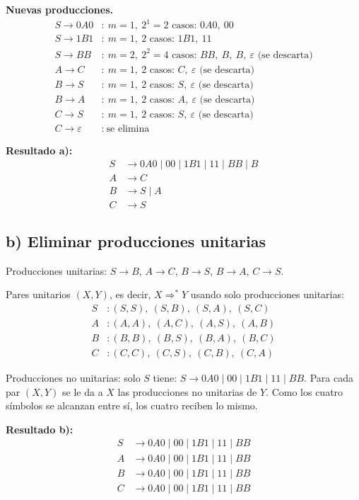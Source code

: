 \documentclass[11pt]{article}
\newcommand{\eps}{\varepsilon}
\begin{document}
\textbf{Nuevas producciones.}
\begin{align*}
S \to 0A0 &:\ m=1,\ 2^1=2 \text{ casos: } 0A0,\ 00\\
S \to 1B1 &:\ m=1,\ 2 \text{ casos: } 1B1,\ 11\\
S \to BB  &:\ m=2,\ 2^2=4 \text{ casos: } BB,\ B,\ B,\ \eps \text{ (se descarta)}\\
A \to C   &:\ m=1,\ 2 \text{ casos: } C,\ \eps \text{ (se descarta)}\\
B \to S   &:\ m=1,\ 2 \text{ casos: } S,\ \eps \text{ (se descarta)}\\
B \to A   &:\ m=1,\ 2 \text{ casos: } A,\ \eps \text{ (se descarta)}\\
C \to S   &:\ m=1,\ 2 \text{ casos: } S,\ \eps \text{ (se descarta)}\\
C \to \eps &:\ \text{se elimina}
\end{align*}

\textbf{Resultado a):}
\begin{align*}
S &\to 0A0 \mid 00 \mid 1B1 \mid 11 \mid BB \mid B\\
A &\to C\\
B &\to S \mid A\\
C &\to S
\end{align*}

\subsection*{b) Eliminar producciones unitarias}

Producciones unitarias: $S \to B$, $A \to C$, $B \to S$, $B \to A$, $C \to S$.

Pares unitarios $(X,Y)$, es decir, $X \Rightarrow^* Y$ usando solo producciones unitarias:
\begin{align*}
S &: (S,S),\ (S,B),\ (S,A),\ (S,C)\\
A &: (A,A),\ (A,C),\ (A,S),\ (A,B)\\
B &: (B,B),\ (B,S),\ (B,A),\ (B,C)\\
C &: (C,C),\ (C,S),\ (C,B),\ (C,A)
\end{align*}

Producciones no unitarias: solo $S$ tiene:
$S \to 0A0 \mid 00 \mid 1B1 \mid 11 \mid BB$.
Para cada par $(X,Y)$ se le da a $X$ las producciones no unitarias de $Y$. Como los cuatro s\'imbolos se alcanzan entre s\'i, los cuatro reciben lo mismo.

\textbf{Resultado b):}
\begin{align*}
S &\to 0A0 \mid 00 \mid 1B1 \mid 11 \mid BB\\
A &\to 0A0 \mid 00 \mid 1B1 \mid 11 \mid BB\\
B &\to 0A0 \mid 00 \mid 1B1 \mid 11 \mid BB\\
C &\to 0A0 \mid 00 \mid 1B1 \mid 11 \mid BB
\end{align*}
\end{document}
